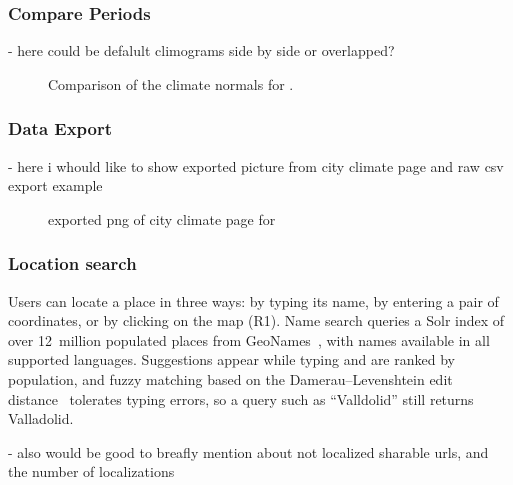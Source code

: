 \subsubsection{Compare Periods}\label{sec:web-application:features:compare-periods}
- here could be defalult climograms side by side or overlapped?

\begin{figure}[t]
  \centering
  \caption{Comparison of the climate normals for \examplecity{}.}
  \label{fig:compare-periods}
\end{figure}

\subsubsection{Data Export}\label{sec:web-application:features:data-export}
- here i whould like to show exported picture from city climate page and raw csv export example

\begin{figure}[t]
  \centering
  \caption{exported png of city climate page for \examplecity{} }
  \label{fig:compare-periods}
\end{figure}

\subsubsection{Location search}\label{sec:web-application:features:location-search}
Users can locate a place in three ways: by typing its name, by entering a pair of
coordinates, or by clicking on the map (R1). Name search queries a Solr index of
over 12~million populated places from GeoNames~\cite{geonames}, with names available
in all supported languages. Suggestions appear while typing and are ranked by
population, and fuzzy matching based on the Damerau--Levenshtein edit
distance~\cite{damerau1964technique} tolerates typing errors, so a query such as
``Valldolid'' still returns Valladolid.

- also would be good to breafly mention about not localized sharable urls, and the number of localizations 